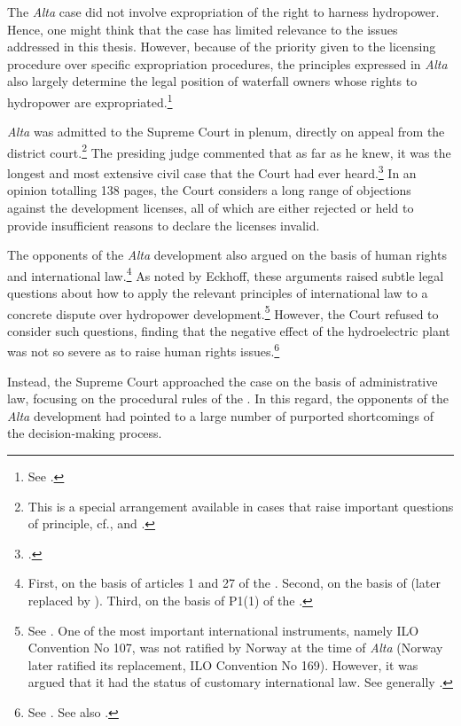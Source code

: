 The {\it Alta} case did not involve expropriation of the right to harness hydropower. Hence, one might think that the case has limited relevance to the issues addressed in this thesis. However, because of the priority given to the licensing procedure over specific expropriation procedures, the principles expressed in {\it Alta} also largely determine the legal position of waterfall owners whose rights to hydropower are expropriated.\footnote{See \cite{sauda09,jorpeland11}.}

{\it Alta} was admitted to the Supreme Court in plenum, directly on appeal from the district court.\footnote{This is a special arrangement available in cases that raise important questions of principle, cf., \cite[30-2]{cda05} and \cite[5]{ca15}.} The presiding judge commented that as far as he knew, it was the longest and most extensive civil case that the Court had ever heard.\footcite[254]{alta82} In an opinion totalling 138 pages, the Court considers a long range of objections against the development licenses, all of which are either rejected or held to provide insufficient reasons to declare the licenses invalid.

The opponents of the {\it Alta} development also argued on the basis of human rights and international law.\footnote{First, on the basis of articles 1 and 27 of the \cite{fnp}. Second, on the basis of \cite{ilo107} (later replaced by \cite{ilo169}). Third, on the basis of P1(1) of the \cite{echr}.} As noted by Eckhoff, these arguments raised subtle legal questions about how to apply the relevant principles of international law to a concrete dispute over hydropower development.\footnote{See \cite[351-352]{eckhoff82}. One of the most important international instruments, namely ILO Convention No 107, was not ratified by Norway at the time of {\it Alta} (Norway later ratified its replacement, ILO Convention No 169). However, it was argued that it had the status of customary international law. See generally \cite{eide80}.}
However, the Court refused to consider such  questions, finding that the negative effect of the hydroelectric plant was not so severe as to raise  human rights issues.\footnote{See \cite[299-300]{alta82}. See also \cite[351-352]{eckhoff82}.}

Instead, the Supreme Court approached the case on the basis of administrative law, focusing on the  procedural rules of the \cite{wra17}. In this regard, the opponents of the {\it Alta} development had pointed to a large number of purported shortcomings of the decision-making process. 

